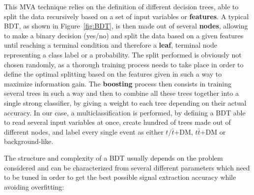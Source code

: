 \documentclass[a4paper, 10pt, openright]{report}
\begin{document}
This \ac{MVA} technique relies on the definition of different decision trees, able to split the data recursively based on a set of input variables or \textbf{features}. A typical \ac{BDT}, as shown in Figure~\ref{fig:BDT}, is then made out of several \textbf{nodes}, allowing to make a binary decision (yes/no) and split the data based on a given features until reaching a terminal condition and therefore a \textbf{leaf}, terminal node representing a class label or a probability. The split performed is obviously not chosen randomly, as a thorough training process needs to take place in order to define the optimal splitting based on the features given in such a way to maximize information gain. The \textbf{boosting} process then consists in training several trees in such a way and then to combine all these trees together into a single strong classifier, by giving a weight to each tree depending on their actual accuracy. In our case, a multiclassification is performed, by defining a \ac{BDT} able to read several input variables at once, create hundred of trees made out of different nodes, and label every single event as either $t/\bar t$+DM, $t \bar t$+DM or background-like.

The structure and complexity of a \ac{BDT} usually depends on the problem considered and can be characterized from several different parameters which need to be tuned in order to get the best possible signal extraction accuracy while avoiding overfitting:
\end{document}
